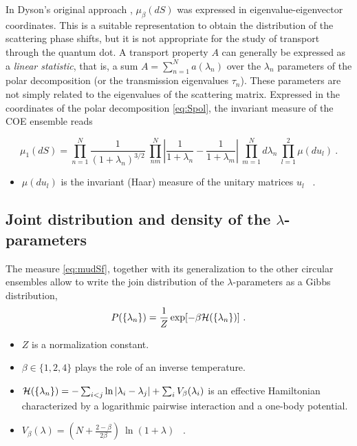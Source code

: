 \documentclass[a4paper,10pt]{article}
\newcommand{\nin}{\noindent}
\begin{document}
\nin In Dyson's original approach \cite{Dy}, $\mu_{\beta}(dS)$ was expressed in eigenvalue-eigenvector coordinates. This is a suitable representation to obtain the distribution of the scattering phase shifts, but it is not appropriate for the study of transport through the quantum dot. A transport property $A$ can generally be expressed as a {\it linear statistic}, that is, a sum $A=\sum_{n=1}^{N} a(\lambda_{n})$ over the $\lambda_{n}$ parameters of the polar decomposition (or the transmission eigenvalues $\tau_{n}$). These parameters are not simply related to the eigenvalues of the scattering matrix. Expressed in the coordinates of the polar decomposition \eqref{eq:Spol}, the invariant measure of the COE ensemble reads \cite{JP}

\begin{equation}
\mu_1(dS) = \prod_{n=1}^N \frac{1}{(1+ \lambda_n)^{3/2}} \
\prod_{nm}^N {\left| \frac{1}{1+ \lambda_n} -
\frac{1}{1+\lambda_m} \right |} \
\prod_{m=1}^{N} d\lambda_{n} \ \prod_{l=1}^2 \mu(du_{l}) \ .
\label{eq:mudSf}
\end{equation}

\begin{itemize}

\item $\mu(du_{l})$ is the invariant (Haar) measure of the unitary matrices $u_{l}$ \ .

\end{itemize} 

\subsection{Joint distribution and density of the $\lambda$-parameters}

\nin The measure \eqref{eq:mudSf}, together with its generalization to the other circular ensembles \cite{JP,KF} allow to write the join distribution of the $\lambda$-parameters as a Gibbs distribution,
\begin{equation}
P(\{\lambda_{n}\}) = \frac{1}{Z}\exp[- \beta {\cal H}(\{\lambda_{n}\})] \ .
\label{eq:Gibbs}
\end{equation}
\begin{itemize}

\item $Z$ is a normalization constant.

\item $\beta\in\{1, 2, 4\}$ plays the role of an inverse temperature.

\item ${\cal H}(\{\lambda_{n}\}) = - \sum_{i<j} \ln{\left|\lambda_{i} -
\lambda_{j} \right|} + \sum_{i} V_{\beta} (\lambda_{i})$ is an effective Hamiltonian characterized by a logarithmic pairwise interaction and a one-body potential.

\item $V_{\beta}(\lambda) = \left( N + \frac{2-\beta}{2\beta} \right) \ \ln{(1+\lambda)}$ \ .

\end{itemize} 
\end{document}
